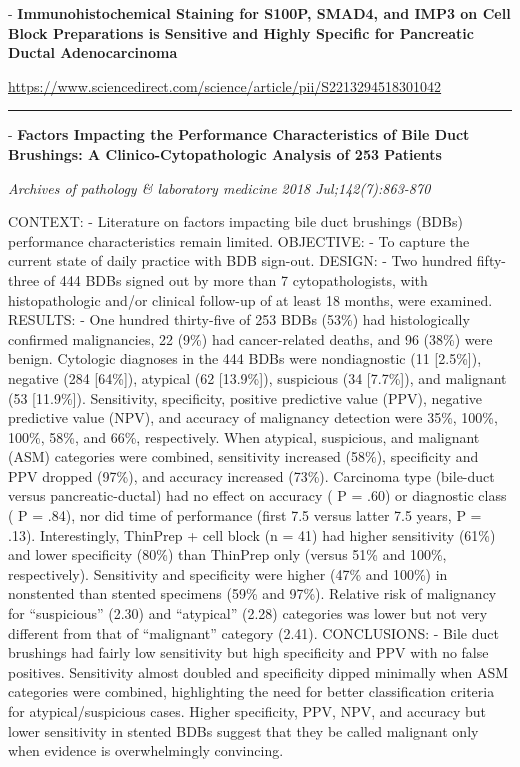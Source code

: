 \documentclass[]{article}
\begin{document}
 - \textbf{Immunohistochemical Staining for S100P, SMAD4, and IMP3 on
Cell Block Preparations is Sensitive and Highly Specific for Pancreatic
Ductal Adenocarcinoma}

\url{https://www.sciencedirect.com/science/article/pii/S2213294518301042}

\begin{center}\rule{0.5\linewidth}{\linethickness}\end{center}

 - \textbf{Factors Impacting the Performance Characteristics of Bile
Duct Brushings: A Clinico-Cytopathologic Analysis of 253 Patients}

\emph{Archives of pathology \& laboratory medicine 2018
Jul;142(7):863-870}

CONTEXT: - Literature on factors impacting bile duct brushings (BDBs)
performance characteristics remain limited. OBJECTIVE: - To capture the
current state of daily practice with BDB sign-out. DESIGN: - Two hundred
fifty-three of 444 BDBs signed out by more than 7 cytopathologists, with
histopathologic and/or clinical follow-up of at least 18 months, were
examined. RESULTS: - One hundred thirty-five of 253 BDBs (53\%) had
histologically confirmed malignancies, 22 (9\%) had cancer-related
deaths, and 96 (38\%) were benign. Cytologic diagnoses in the 444 BDBs
were nondiagnostic (11 {[}2.5\%{]}), negative (284 {[}64\%{]}), atypical
(62 {[}13.9\%{]}), suspicious (34 {[}7.7\%{]}), and malignant (53
{[}11.9\%{]}). Sensitivity, specificity, positive predictive value
(PPV), negative predictive value (NPV), and accuracy of malignancy
detection were 35\%, 100\%, 100\%, 58\%, and 66\%, respectively. When
atypical, suspicious, and malignant (ASM) categories were combined,
sensitivity increased (58\%), specificity and PPV dropped (97\%), and
accuracy increased (73\%). Carcinoma type (bile-duct versus
pancreatic-ductal) had no effect on accuracy ( P = .60) or diagnostic
class ( P = .84), nor did time of performance (first 7.5 versus latter
7.5 years, P = .13). Interestingly, ThinPrep + cell block (n = 41) had
higher sensitivity (61\%) and lower specificity (80\%) than ThinPrep
only (versus 51\% and 100\%, respectively). Sensitivity and specificity
were higher (47\% and 100\%) in nonstented than stented specimens (59\%
and 97\%). Relative risk of malignancy for ``suspicious'' (2.30) and
``atypical'' (2.28) categories was lower but not very different from
that of ``malignant'' category (2.41). CONCLUSIONS: - Bile duct
brushings had fairly low sensitivity but high specificity and PPV with
no false positives. Sensitivity almost doubled and specificity dipped
minimally when ASM categories were combined, highlighting the need for
better classification criteria for atypical/suspicious cases. Higher
specificity, PPV, NPV, and accuracy but lower sensitivity in stented
BDBs suggest that they be called malignant only when evidence is
overwhelmingly convincing.
\end{document}
